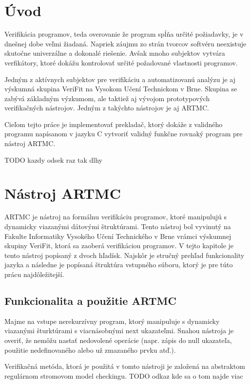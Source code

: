 
\chapter{Úvod}
Verifikácia programov, teda overovanie že program spĺňa určité požiadavky, je v dnešnej dobe veľmi žiadaná. Napriek záujmu zo strán tvorcov softvéru neexistuje skutočne univerzálne a dokonalé riešenie. Avšak mnoho subjektov vytvára verfikátory, ktoré dokážu kontrolovať určité požadované vlastnosti programov.

Jedným z aktívnych subjektov pre verifikáciu a automatizovanú analýzu je aj výskumná skupina VeriFit na Vysokom Učení Technickom v Brne. Skupina se zabývá základným výzkumom, ale taktiež aj vývojom prototypových verifikačných nástrojov. Jedným z takýchto nástrojov je aj ARTMC.

Cieľom tejto práce je implementovať prekladač, ktorý dokáže z validného programu napísanom v jazyku C vytvoriť validný funkčne rovnaký program pre nástroj ARTMC.

TODO kazdy odsek raz tak dlhy


\chapter{Nástroj ARTMC}
ARTMC je nástroj na formálnu verifikáciu programov, ktoré manipulujú s
dynamicky viazanými dátovými štruktúrami. Tento nástroj bol vyvinutý na Fakulte
Informatiky Vysokého Učení Technického v Brne vrámci výskumnej skupiny VeriFit,
ktorá sa zaoberá verifikáciou programov. V tejto kapitole je tento nástroj
popísaný z dvoch hľadísk. Najskôr je stručný prehľad funkcionality jazyka a
následne je popísaná štruktúra vstupného súboru, ktorý je pre túto prácu
najdôležitejší.

\section{Funkcionalita a použitie ARTMC}
Majme na vstupe nerekurzívny program, ktorý manipuluje s dynamicky viazanými
šturktúrami s viacnásobnými next ukazateľmi. Snahou nástroja je overiť, že
nemôžu nastať nedovolené operácie (napr. zápis do null ukazateľa, použitie
nedefinovaného alebo už zmazaného prvku atď.).

Verifikačná metóda, ktorá je použitá v tomto nástroji je založená na abstraktom
regulárnom stromovom model checkingu. TODO odkaz kde sa o tom najde viac


